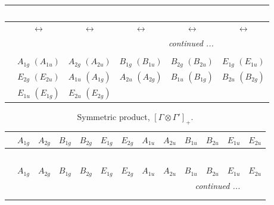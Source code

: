 \documentclass[fleqn,10pt,landscape]{article}
\begin{document}
\begin{itemize}
\begin{center}
\begin{longtable}{cccccc}
\multicolumn{5}{l}{\tablename\ \thetable{}} \\
 \hline \hline
 & $\leftrightarrow$ & $\leftrightarrow$ & $\leftrightarrow$ & $\leftrightarrow$ & $\leftrightarrow$ \\ \hline \endhead

 \hline \hline
\multicolumn{5}{r}{\footnotesize\it continued ...} \\ \endfoot

 \hline \hline
\multicolumn{5}{r}{} \\ \endlastfoot

 & $ A_{1g}\,\,(A_{1u}) $ & $ A_{2g}\,\,(A_{2u}) $ & $ B_{1g}\,\,(B_{1u}) $ & $ B_{2g}\,\,(B_{2u}) $ & $ E_{1g}\,\,(E_{1u}) $ \\
& $ E_{2g}\,\,(E_{2u}) $ & $ A_{1u}\,\,(A_{1g}) $ & $ A_{2u}\,\,(A_{2g}) $ & $ B_{1u}\,\,(B_{1g}) $ & $ B_{2u}\,\,(B_{2g}) $ \\
& $ E_{1u}\,\,(E_{1g}) $ & $ E_{2u}\,\,(E_{2g}) $ & $  $ & $  $ & $  $ \\
\end{longtable}
\end{center}
\begin{center}
\renewcommand{\arraystretch}{1.0}
\begin{longtable}{c|cccccccccccc}
\caption{Symmetric product, $[\Gamma\otimes\Gamma']_+.$}
 \\
 \hline \hline
 & $ A_{1g} $ & $ A_{2g} $ & $ B_{1g} $ & $ B_{2g} $ & $ E_{1g} $ & $ E_{2g} $ & $ A_{1u} $ & $ A_{2u} $ & $ B_{1u} $ & $ B_{2u} $ & $ E_{1u} $ & $ E_{2u} $ \\ \hline \endfirsthead

\multicolumn{12}{l}{\tablename\ \thetable{}} \\
 \hline \hline
 & $ A_{1g} $ & $ A_{2g} $ & $ B_{1g} $ & $ B_{2g} $ & $ E_{1g} $ & $ E_{2g} $ & $ A_{1u} $ & $ A_{2u} $ & $ B_{1u} $ & $ B_{2u} $ & $ E_{1u} $ & $ E_{2u} $ \\ \hline \endhead

 \hline \hline
\multicolumn{12}{r}{\footnotesize\it continued ...} \\ \endfoot

 \hline \hline
\multicolumn{12}{r}{} \\ \endlastfoot


\end{longtable}
\end{center}
\end{itemize}
\end{document}

